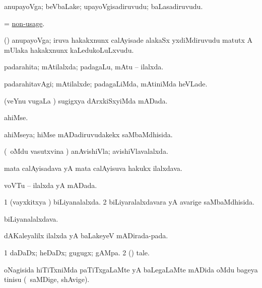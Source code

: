 \bentry
{}
\gl{\nA}
\bmng
anupayoVga; beVbaLake; upayoVgisadiruvudu; baLasadiruvudu. 
\emng
\eentry

\bentry
{}
\gl{\nA}
\bmng
= \hyperlink{non-usage}{non-usage}. 
\emng
\eentry

\bentry
{}
\gl{\nA}
\bmng
(\nAyxshA) anupayoVga; iruva hakakxnunx calAyisade alakaSx yxdiMdiruvudu matutx A mUlaka hakakxnunx kaLedukoLuLxvudu. 
\emng
\eentry

\bentry
{}
\gl{\gu}
\bmng
padarahita; mAtilalxda; padagaLu, mAtu -- ilalxda. 
\emng
\eentry

\bentry
{}
\gl{\kirxvi}
\bmng
padarahitavAgi; mAtilalxde; padagaLiMda, mAtiniMda heVLade. 
\emng
\eentry


\bentry
{}
\gl{\gu}
\bmng
(veYnu \mo vugaLa \vi) sugigxya dArxkiSxyiMda mADada. 
\emng
\eentry

\bentry
{}
\gl{\nA}
\bmng
ahiMse. 
\emng
\eentry

\bentry
{}
\gl{\gu}
\bmng
ahiMseya; hiMse mADadiruvudakekx saMbaMdhisida. 
\emng
\eentry

\bentry
{}
\gl{\gu}
\bmng
(\kanmu\ oMdu vasutxvina \vi) anAvishiVla; avishiVlavalalxda. 
\emng
\eentry

\bentry
{}
\gl{\nA}
\bmng
mata calAyisadava yA mata calAyisuva hakukx ilalxdava. 
\emng
\eentry

\bentry
{}
\gl{\gu}
\bmng
voVTu -- ilalxda yA mADada. 
\emng
\eentry

\bentry
{}
\gl{\gu}
\bmng
\bnum
\num{1} (vayxkitxya \vi) biLiyanalalxda. 
\num{2} biLiyaralalxdavara yA avarige saMbaMdhisida. 
\enum
\emng
\eentry

\bentry
{}
\gl{\nA}
\bmng
biLiyanalalxdava. 
\emng
\eentry

\bentry
{}
\gl{\nA}
\bmng
dAKaleyalilx ilalxda yA baLakeyeV mADirada-pada. 
\emng
\eentry

\bentry
{}
\gl{\nA}
\bmng
\bnum
\num{1} daDaDx; heDaDx; gugugx; gAMpa. 
\num{2} (\ashi) tale. 
\enum
\emng
\eentry

\bentry
{}
\gl{\nA}
\bmng
oNagisida hiTiTxniMda paTiTxgaLaMte yA baLegaLaMte mADida oMdu bageya tinisu (\udA\ saMDige, shAvige). 
\emng
\eentry

